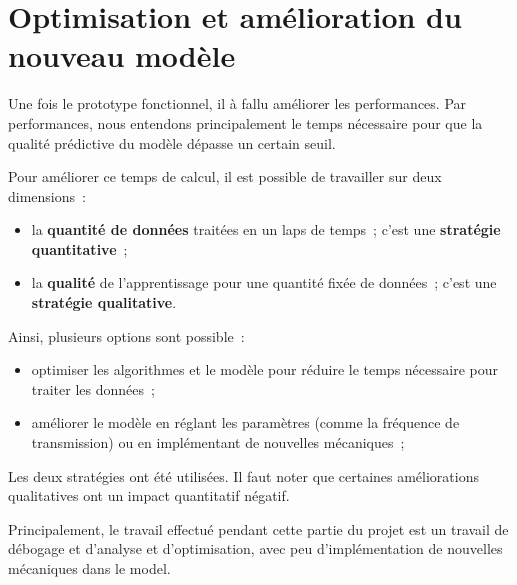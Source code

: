 \section{Optimisation et amélioration du nouveau modèle}

Une fois le prototype fonctionnel, il à fallu améliorer les performances.
Par performances, nous entendons principalement le temps nécessaire pour que la qualité prédictive du modèle dépasse un certain seuil.

Pour améliorer ce temps de calcul, il est possible de travailler sur deux dimensions~:
\begin{itemize}
	\item la \textbf{quantité de données} traitées en un laps de temps~; c'est une \textbf{stratégie quantitative}~;
	\item la \textbf{qualité} de l'apprentissage pour une quantité fixée de données~; c'est une \textbf{stratégie qualitative}.
\end{itemize}

Ainsi, plusieurs options sont possible~:
\begin{itemize}
	\item optimiser les algorithmes et le modèle pour réduire le temps nécessaire pour traiter les données~;
	\item améliorer le modèle en réglant les paramètres (comme la fréquence de transmission) ou en implémentant de nouvelles mécaniques~;
\end{itemize}
\hspace{1em}

Les deux stratégies ont été utilisées. Il faut noter que certaines améliorations qualitatives ont un impact quantitatif négatif.

Principalement, le travail effectué pendant cette partie du projet est un travail de débogage et d'analyse et d'optimisation, avec peu d'implémentation de nouvelles mécaniques dans le \gls{model}.


